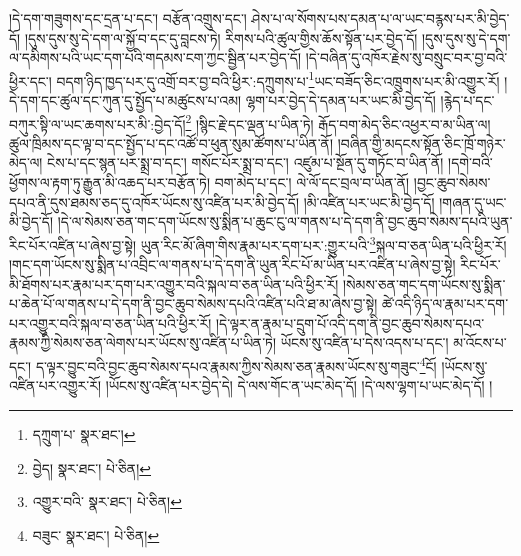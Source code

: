།དེ་དག་གཟུགས་དང་དྲན་པ་དང་། བརྩོན་འགྲུས་དང་། ཤེས་པ་ལ་སོགས་པས་དམན་པ་ལ་ཡང་བརྙས་པར་མི་བྱེད་དོ། །དུས་དུས་སུ་དེ་དག་ལ་སྐྱོ་བ་དང་དུ་བླངས་ཏེ། རིགས་པའི་ཚུལ་གྱིས་ཆོས་སྟོན་པར་བྱེད་དོ། །དུས་དུས་སུ་དེ་དག་ལ་དམིགས་པའི་ཡང་དག་པའི་གདམས་ངག་ཀྱང་སྦྱིན་པར་བྱེད་དོ། །དེ་བཞིན་དུ་འཁོར་རྗེས་སུ་བསྲུང་བར་བྱ་བའི་ཕྱིར་དང་། བདག་ཉིད་ཁྱད་པར་དུ་འགྲོ་བར་བྱ་བའི་ཕྱིར་:དཀྲུགས་པ་\footnote{དཀྲུག་པ་  སྣར་ཐང་། }ཡང་བཟོད་ཅིང་འཁྲུགས་པར་མི་འགྱུར་རོ། །དེ་དག་དང་ཚུལ་དང་ཀུན་དུ་སྤྱོད་པ་མཚུངས་པ་འམ། ལྷག་པར་བྱེད་དེ་དམན་པར་ཡང་མི་བྱེད་དོ། །རྙེད་པ་དང་བཀུར་སྟི་ལ་ཡང་ཆགས་པར་མི་:བྱེད་དོ།\footnote{བྱེད།  སྣར་ཐང་།  པེ་ཅིན། } །སྙིང་རྗེ་དང་ལྡན་པ་ཡིན་ཏེ། རྒོད་བག་མེད་ཅིང་འཕྱར་བ་མ་ཡིན་ལ། ཚུལ་ཁྲིམས་དང་ལྟ་བ་དང་སྤྱོད་པ་དང་འཚོ་བ་ཕུན་སུམ་ཚོགས་པ་ཡིན་ནོ། །བཞིན་གྱི་མདངས་སྟོན་ཅིང་ཁྲོ་གཉེར་མེད་ལ། ངེས་པ་དང་སྙན་པར་སྨྲ་བ་དང་། གསོང་པོར་སྨྲ་བ་དང་། འཛུམ་པ་སྔོན་དུ་གཏོང་བ་ཡིན་ནོ། །དགེ་བའི་ཕྱོགས་ལ་རྟག་ཏུ་རྒྱུན་མི་འཆད་པར་བརྩོན་ཏེ། བག་མེད་པ་དང་། ལེ་ལོ་དང་བྲལ་བ་ཡིན་ནོ། །བྱང་ཆུབ་སེམས་དཔའ་ནི་དུས་ཐམས་ཅད་དུ་འཁོར་ཡོངས་སུ་འཛིན་པར་མི་བྱེད་དོ། །མི་འཛིན་པར་ཡང་མི་བྱེད་དོ། །གཞན་དུ་ཡང་མི་བྱེད་དོ། །དེ་ལ་སེམས་ཅན་གང་དག་ཡོངས་སུ་སྨིན་པ་ཆུང་ངུ་ལ་གནས་པ་དེ་དག་ནི་བྱང་ཆུབ་སེམས་དཔའི་ཡུན་རིང་པོར་འཛིན་པ་ཞེས་བྱ་སྟེ། ཡུན་རིང་མོ་ཞིག་གིས་རྣམ་པར་དག་པར་:གྱུར་པའི་\footnote{འགྱུར་བའི་  སྣར་ཐང་།  པེ་ཅིན། }སྐལ་བ་ཅན་ཡིན་པའི་ཕྱིར་རོ། །གང་དག་ཡོངས་སུ་སྨིན་པ་འབྲིང་ལ་གནས་པ་དེ་དག་ནི་ཡུན་རིང་པོ་མ་ཡིན་པར་འཛིན་པ་ཞེས་བྱ་སྟེ། རིང་པོར་མི་ཐོགས་པར་རྣམ་པར་དག་པར་འགྱུར་བའི་སྐལ་བ་ཅན་ཡིན་པའི་ཕྱིར་རོ། །སེམས་ཅན་གང་དག་ཡོངས་སུ་སྨིན་པ་ཆེན་པོ་ལ་གནས་པ་དེ་དག་ནི་བྱང་ཆུབ་སེམས་དཔའི་འཛིན་པའི་ཐ་མ་ཞེས་བྱ་སྟེ། ཚེ་འདི་ཉིད་ལ་རྣམ་པར་དག་པར་འགྱུར་བའི་སྐལ་བ་ཅན་ཡིན་པའི་ཕྱིར་རོ། །དེ་ལྟར་ན་རྣམ་པ་དྲུག་པོ་འདི་དག་ནི་བྱང་ཆུབ་སེམས་དཔའ་རྣམས་ཀྱི་སེམས་ཅན་ལེགས་པར་ཡོངས་སུ་འཛིན་པ་ཡིན་ཏེ། ཡོངས་སུ་འཛིན་པ་དེས་འདས་པ་དང་། མ་འོངས་པ་དང་། ད་ལྟར་བྱུང་བའི་བྱང་ཆུབ་སེམས་དཔའ་རྣམས་ཀྱིས་སེམས་ཅན་རྣམས་ཡོངས་སུ་གཟུང་\footnote{བཟུང་  སྣར་ཐང་།  པེ་ཅིན། }ངོ། །ཡོངས་སུ་འཛིན་པར་འགྱུར་རོ། །ཡོངས་སུ་འཛིན་པར་བྱེད་དེ། དེ་ལས་གོང་ན་ཡང་མེད་དོ། །དེ་ལས་ལྷག་པ་ཡང་མེད་དོ། །
